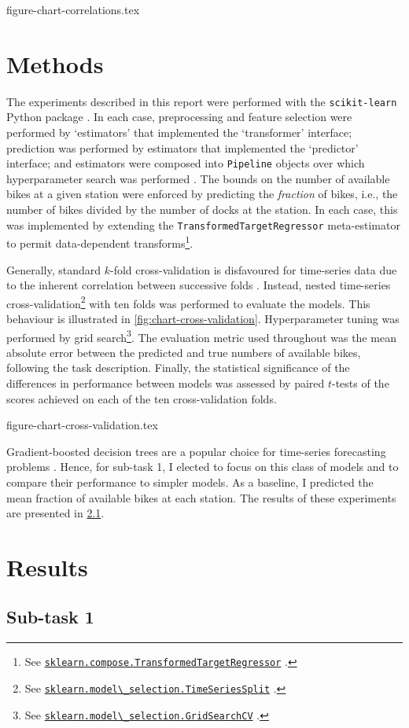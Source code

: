 \documentclass[11pt]{extarticle}
\newcommand{\sklearn}[1]{
  \href{https://scikit-learn.org/stable/modules/generated/sklearn.#1.html}{\lstinline|sklearn.#1|}
}
\begin{document}
{figure-chart-correlations.tex}

\section{Methods}
\label{sec:methods}

The experiments described in this report were performed with the \texttt{scikit-learn}
Python package \parencite{Pedregosa2011}.
In each case, preprocessing and feature selection were performed by `estimators' that
implemented the `transformer' interface; prediction was performed by estimators that
implemented the `predictor' interface; and estimators were composed into
\texttt{Pipeline} objects over which hyperparameter search was performed
\parencite[4-9]{Buitinck2013}.
The bounds on the number of available bikes at a given station were enforced by
predicting the \emph{fraction} of bikes, i.e., the number of bikes divided by the number
of docks at the station.
In each case, this was implemented by extending the \texttt{TransformedTargetRegressor}
meta-estimator to permit data-dependent
transforms\footnote{See \sklearn{compose.TransformedTargetRegressor}.}.

Generally, standard $k$-fold cross-validation is disfavoured for time-series data due
to the inherent correlation between successive folds \parencite{Bergmeir2018}.
Instead, nested time-series
cross-validation\footnote{See \sklearn{model\_selection.TimeSeriesSplit}.} with ten folds
was performed to evaluate the models.
This behaviour is illustrated in \cref{fig:chart-cross-validation}.
Hyperparameter tuning was performed by grid
search\footnote{See \sklearn{model\_selection.GridSearchCV}.}.
The evaluation metric used throughout was the mean absolute error between the predicted
and true numbers of available bikes, following the task description.
Finally, the statistical significance of the differences in performance between models
was assessed by paired $t$-tests of the scores achieved on each of the ten
cross-validation folds.

{figure-chart-cross-validation.tex}

Gradient-boosted decision trees are a popular choice for time-series forecasting
problems
\parencite[e.g.,][]{Bojer2021}.
Hence, for sub-task 1, I elected to focus on this class of models and to compare their
performance to simpler models.
As a baseline, I predicted the mean fraction of available bikes at each station.
The results of these experiments are presented in \cref{sec:results-subtask-1}.

\section{Results}
\label{sec:results}

\subsection{Sub-task 1}
\label{sec:results-subtask-1}

\printbibliography
\end{document}

